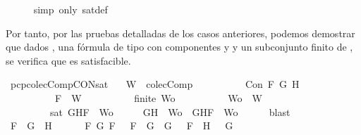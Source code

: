 \begin{isabellebody}
\ \ \ \ \isamarkupfalse%
\ {\isacharparenleft}simp\ only{\isacharcolon}\ sat{\isacharunderscore}def{\isacharparenright}\isanewline
{}\isamarkupfalse%
%
\endisatagproof
{\isafoldproof}%
%
\isadelimproof
%
\endisadelimproof
%
\begin{isamarkuptext}%
Por tanto, por las pruebas detalladas de los casos anteriores, podemos demostrar que dados 
  ,  una fórmula de tipo \isa{{\isasymalpha}} con componentes  y  y  un subconjunto finito 
  de , se verifica que  es satisfacible.%
\end{isamarkuptext}\isamarkuptrue%
\isamarkupfalse%
\ pcp{\isacharunderscore}colecComp{\isacharunderscore}CON{\isacharunderscore}sat{\isacharcolon}\isanewline
\ \ \ {\isachardoublequoteopen}W\ {\isasymin}\ colecComp{\isachardoublequoteclose}\isanewline
\ \ \ \ \ \ \ \ \ \ {\isachardoublequoteopen}Con\ F\ G\ H{\isachardoublequoteclose}\isanewline
\ \ \ \ \ \ \ \ \ \ {\isachardoublequoteopen}F\ {\isasymin}\ W{\isachardoublequoteclose}\isanewline
\ \ \ \ \ \ \ \ \ \ {\isachardoublequoteopen}finite\ Wo{\isachardoublequoteclose}\isanewline
\ \ \ \ \ \ \ \ \ \ {\isachardoublequoteopen}Wo\ {\isasymsubseteq}\ W{\isachardoublequoteclose}\isanewline
\ \ \ \ \ \ \ \ \ {\isachardoublequoteopen}sat\ {\isacharparenleft}{\isacharbraceleft}G{\isacharcomma}H{\isacharcomma}F{\isacharbraceright}\ {\isasymunion}\ Wo{\isacharparenright}{\isachardoublequoteclose}\isanewline
%
\isadelimproof
%
\endisadelimproof
%
\isatagproof
{}\isamarkupfalse%
\ {\isacharminus}\isanewline
\ \ \isamarkupfalse%
\ {\isachardoublequoteopen}{\isacharbraceleft}G{\isacharcomma}H{\isacharbraceright}\ {\isasymunion}\ Wo\ {\isasymsubseteq}\ {\isacharbraceleft}G{\isacharcomma}H{\isacharcomma}F{\isacharbraceright}\ {\isasymunion}\ Wo{\isachardoublequoteclose}\isanewline
\ \ \ \ \isamarkupfalse%
\ blast\isanewline
\ \ \isamarkupfalse%
\ {\isachardoublequoteopen}F\ {\isacharequal}\ G\ \isactrlbold {\isasymand}\ H\ {\isasymor}\ \isanewline
\ \ \ \ {\isacharparenleft}{\isasymexists}F{}\ G{}{\isachardot}\ F\ {\isacharequal}\ \isactrlbold {\isasymnot}\ {\isacharparenleft}F{}\ \isactrlbold {\isasymor}\ G{}{\isacharparenright}\ {\isasymand}\ G\ {\isacharequal}\ \isactrlbold {\isasymnot}\ F{}\ {\isasymand}\ H\ {\isacharequal}\ \isactrlbold {\isasymnot}\ G{}{\isacharparenright}\ {\isasymor}\ \isanewline

\end{isabellebody}
